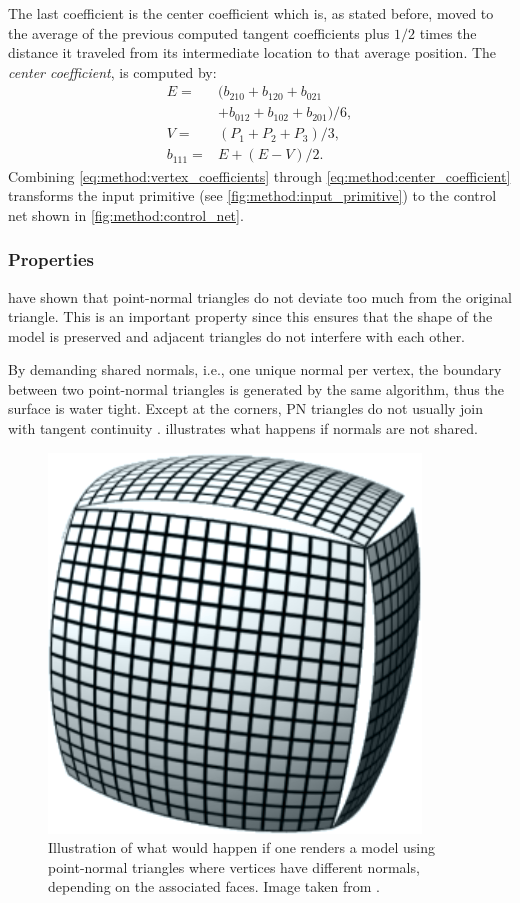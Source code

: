 The last coefficient is the center coefficient which is, as stated before, moved to the average of the previous computed tangent coefficients plus $1/2$ times the distance it traveled from its intermediate location to that average position. The \textit{center coefficient}, is computed by:
\begin{align}\label{eq:method:center_coefficient}
	E = {}& (b_{210} + b_{120} + b_{021} \nonumber \\
		{}& + b_{012} + b_{102} + b_{201}) / 6, \nonumber\\
	V = {}& (P_1 + P_2 + P_3) / 3, \\
	b_{111} = {}& E + (E - V) / 2. \nonumber
\end{align}
Combining \eqref{eq:method:vertex_coefficients} through \eqref{eq:method:center_coefficient} transforms the input primitive (see \cref{fig:method:input_primitive}) to the control net shown in \cref{fig:method:control_net}.

\subsubsection{Properties}
\label{sss:method:geometric:properties}
\citeauthor{vlachos2001curved} have shown that point-normal triangles do not deviate too much from the original triangle. This is an important property since this ensures that the shape of the model is preserved and adjacent triangles do not interfere with each other. 

By demanding shared normals, i.e., one unique normal per vertex, the boundary between two point-normal triangles is generated by the same algorithm, thus the surface is water tight. Except at the corners, PN triangles do not usually join with tangent continuity \cite{vlachos2001curved}.  illustrates what happens if normals are not shared.

\begin{figure}
	\centering
	\includegraphics[width=0.4\columnwidth]{./content/img/method/cracks.png}
	\caption{Illustration of what would happen if one renders a model using point-normal triangles where vertices have different normals, depending on the associated faces. Image taken from \cite{mcdonald2010crack}.}
	\label{fig:method:cracks}
\end{figure}